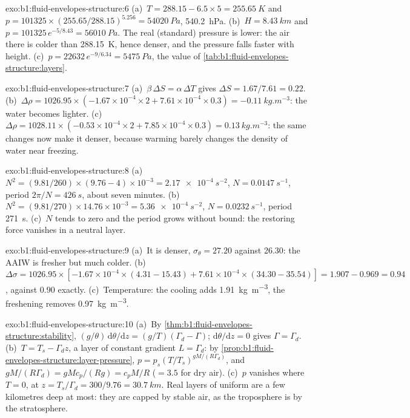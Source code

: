 \begin{solution}{exo:b1:fluid-envelopes-structure:6}
(a)~$T = 288.15 - 6.5 \times 5 = \qty{255.65}{K}$ and $p = \num{101325} \times
(255.65/288.15)^{5.256} = \qty{54020}{Pa}$, \qty{540.2}{hPa}. (b)~$H =
\qty{8.43}{km}$ and $p = \num{101325}\,e^{-5/8.43} = \qty{56010}{Pa}$. The real
(standard) pressure is lower: the air there is colder than \qty{288.15}{K}, hence
denser, and the pressure falls faster with height. (c)~$p = \num{22632}\,
e^{-9/6.34} = \qty{5475}{Pa}$, the value of
\cref{tab:b1:fluid-envelopes-structure:layers}.
\end{solution}

\begin{solution}{exo:b1:fluid-envelopes-structure:7}
(a)~$\beta\,\Delta S = \alpha\,\Delta T$ gives $\Delta S = 1.67/7.61 = 0.22$.
(b)~$\Delta\rho = 1026.95 \times (-1.67\times10^{-4} \times 2 + 7.61\times10^{-4}
\times 0.3) = \qty{-0.11}{kg.m^{-3}}$: the water becomes lighter.
(c)~$\Delta\rho = 1028.11 \times (-0.53\times10^{-4} \times 2 + 7.85\times10^{-4}
\times 0.3) = \qty{+0.13}{kg.m^{-3}}$: the same changes now make it denser, because
warming barely changes the density of water near freezing.
\end{solution}

\begin{solution}{exo:b1:fluid-envelopes-structure:8}
(a)~$N^2 = (9.81/260) \times (9.76 - 4)\times10^{-3} = \qty{2.17e-4}{s^{-2}}$,
$N = \qty{0.0147}{s^{-1}}$, period $2\pi/N = \qty{426}{s}$, about seven
minutes. (b)~$N^2 = (9.81/270) \times 14.76\times10^{-3} = \qty{5.36e-4}{s^{-2}}$,
$N = \qty{0.0232}{s^{-1}}$, period \qty{271}{s}. (c)~$N$ tends to zero and the
period grows without bound: the restoring force vanishes in a neutral layer.
\end{solution}

\begin{solution}{exo:b1:fluid-envelopes-structure:9}
(a)~It is denser, $\sigma_\theta = 27.20$ against 26.30: the AAIW is fresher
but much colder. (b)~$\Delta\sigma = 1026.95 \times [-1.67\times10^{-4} \times
(4.31 - 15.43) + 7.61\times10^{-4} \times (34.30 - 35.54)] = 1.907 - 0.969 =
0.94$, against $0.90$ exactly. (c)~Temperature: the cooling adds
\qty{1.91}{kg.m^{-3}}, the freshening removes \qty{0.97}{kg.m^{-3}}.
\end{solution}

\begin{solution}{exo:b1:fluid-envelopes-structure:10}
(a)~By \cref{thm:b1:fluid-envelopes-structure:stability}, $(g/\theta)\,\mathrm
d\theta/\mathrm dz = (g/T)(\Gamma_d - \Gamma)$; $\mathrm d\theta/\mathrm dz = 0$
gives $\Gamma = \Gamma_d$. (b)~$T = T_s - \Gamma_d z$, a layer of constant gradient
$L = \Gamma_d$: by \cref{prop:b1:fluid-envelopes-structure:layer-pressure}, $p =
p_s (T/T_s)^{gM/(R\Gamma_d)}$, and $gM/(R\Gamma_d) = gMc_p/(Rg) = c_pM/R$
($= 3.5$ for dry air). (c)~$p$ vanishes where $T = 0$, at $z = T_s/\Gamma_d =
300/9.76 = \qty{30.7}{km}$. Real layers of uniform  are a
few kilometres deep at most: they are capped by stable air, as the troposphere is
by the stratosphere.
\end{solution}

